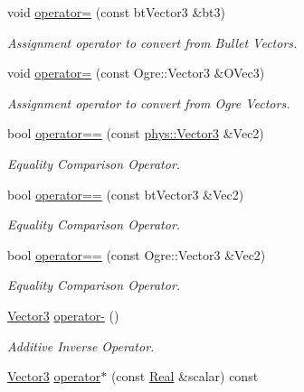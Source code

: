\begin{DoxyCompactItemize}
void \hyperlink{classphys_1_1Vector3_a7163daa9f9bee5214cc740f9d5ce9ed3}{operator=} (const btVector3 \&bt3)
\begin{DoxyCompactList}\small\item\em Assignment operator to convert from Bullet Vectors. \item\end{DoxyCompactList}\item 
void \hyperlink{classphys_1_1Vector3_aea33e020934fe37bb415b034f3d057f1}{operator=} (const Ogre::Vector3 \&OVec3)
\begin{DoxyCompactList}\small\item\em Assignment operator to convert from Ogre Vectors. \item\end{DoxyCompactList}\item 
bool \hyperlink{classphys_1_1Vector3_a90dadb1a5cd2c5814e54c11c33f286c1}{operator==} (const \hyperlink{classphys_1_1Vector3}{phys::Vector3} \&Vec2)
\begin{DoxyCompactList}\small\item\em Equality Comparison Operator. \item\end{DoxyCompactList}\item 
bool \hyperlink{classphys_1_1Vector3_a1146d1b1b0f3d8809edfbd24e79b724a}{operator==} (const btVector3 \&Vec2)
\begin{DoxyCompactList}\small\item\em Equality Comparison Operator. \item\end{DoxyCompactList}\item 
bool \hyperlink{classphys_1_1Vector3_aef82f53ef74363d7b662cbd1d3c204db}{operator==} (const Ogre::Vector3 \&Vec2)
\begin{DoxyCompactList}\small\item\em Equality Comparison Operator. \item\end{DoxyCompactList}\item 
\hyperlink{classphys_1_1Vector3}{Vector3} \hyperlink{classphys_1_1Vector3_afb86ac7edd78353ec3d11d9f2efdf0cb}{operator-\/} ()
\begin{DoxyCompactList}\small\item\em Additive Inverse Operator. \item\end{DoxyCompactList}\item 
\hyperlink{classphys_1_1Vector3}{Vector3} \hyperlink{classphys_1_1Vector3_ab9b40eb9eb73d806434550604e048faa}{operator$\ast$} (const \hyperlink{namespacephys_af7eb897198d265b8e868f45240230d5f}{Real} \&scalar) const 

\end{DoxyCompactItemize}

